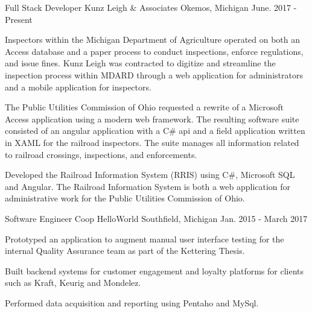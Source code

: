 
\begin{cventries}

  \cventry
    {Full Stack Developer} %
    {Kunz Leigh \& Associates} %
    {Okemos, Michigan} %
    {June. 2017 - Present} %
    {
      \begin{cvitems} %
      \item {Inspectors within the Michigan Department of Agriculture operated on both an Access database and a paper process to conduct inspections, enforce regulations, and issue fines. Kunz Leigh was contracted to digitize and streamline the inspection process within MDARD through a web application for administrators and a mobile application for inspectors.}
      \item {The Public Utilities Commission of Ohio requested a rewrite of a Microsoft Access application using a modern web framework. The resulting software suite consisted of an angular application with a C\# api and a field application written in XAML for the railroad inspectors. The suite manages all information related to railroad crossings, inspections, and enforcements.}
      \item {Developed the Railroad Information System (RRIS) using C\#, Microsoft SQL and Angular. The Railroad Information System is both a web application for administrative work for the Public Utilities Commission of Ohio.}
      \end{cvitems}
    }

\cventry
  {Software Engineer Coop} %
  {HelloWorld} %
  {Southfield, Michigan} %
  {Jan. 2015 - March 2017} %
  {
    \begin{cvitems} %
    \item {Prototyped an application to augment manual user interface testing for the internal Quality Assurance team as part of the Kettering Thesis.}
    \item {Built backend systems for customer engagement and loyalty platforms for clients such as Kraft, Keurig and Mondelez.}
    \item {Performed data acquisition and reporting using Pentaho and MySql.}
    \end{cvitems}
  }


\end{cventries}
